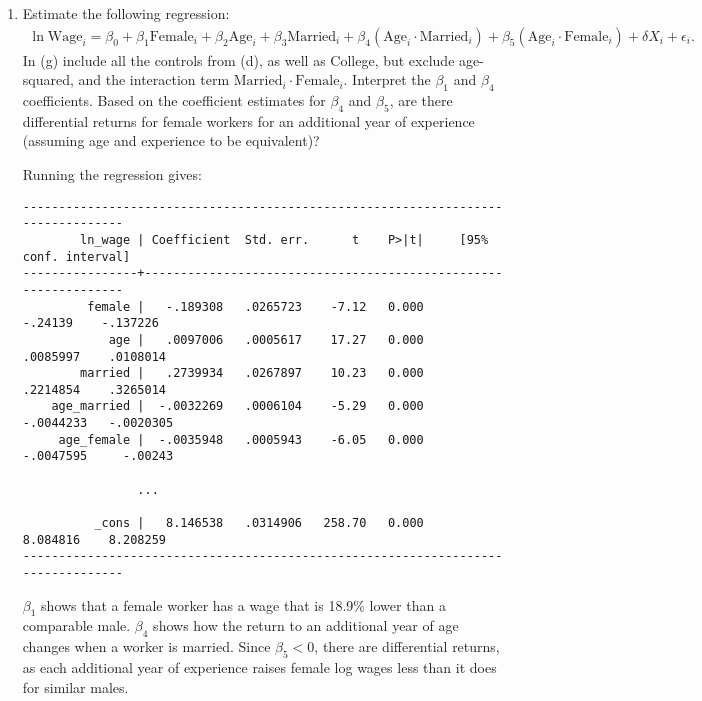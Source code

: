 \documentclass[11pt,twoside,openany]{memoir}
\begin{document}
\begin{question}
\begin{enumerate}[label = (\alph*),itemsep=1pt,topsep=3pt]
        \item Estimate the following regression:
            \begin{equation*}
            \begin{split}
                \ln\text{Wage}_i = \beta_0 + \beta_1 \text{Female}_i + \beta_2 \text{Age}_i + \beta_3 \text{Married}_i + \beta_4 (\text{Age}_i \cdot \text{Married}_i) + \beta_5 (\text{Age}_i \cdot \text{Female}_i)+ \delta X_i + \epsilon_i.
            \end{split}
            \end{equation*}
        In (g) include all the controls from (d), as well as College, but exclude age-squared, and the interaction term $\text{Married}_i \cdot \text{Female}_i$. Interpret the $\beta_1$ and $\beta_4$ coefficients. Based on the coefficient estimates for $\beta_4$ and $\beta_5$, are there differential returns for female workers for an additional year of experience (assuming age and experience to be equivalent)?
            {\color{blue} \begin{solution}
                Running the regression gives:
                \begin{Verbatim}
---------------------------------------------------------------------------------
        ln_wage | Coefficient  Std. err.      t    P>|t|     [95% conf. interval]
----------------+----------------------------------------------------------------
         female |   -.189308   .0265723    -7.12   0.000      -.24139    -.137226
            age |   .0097006   .0005617    17.27   0.000     .0085997    .0108014
        married |   .2739934   .0267897    10.23   0.000     .2214854    .3265014
    age_married |  -.0032269   .0006104    -5.29   0.000    -.0044233   -.0020305
     age_female |  -.0035948   .0005943    -6.05   0.000    -.0047595     -.00243
       
                ...

          _cons |   8.146538   .0314906   258.70   0.000     8.084816    8.208259
---------------------------------------------------------------------------------   
                \end{Verbatim}

                $\beta_1$ shows that a female worker has a wage that is 18.9\% lower than a comparable male. $\beta_4$ shows how the return to an additional year of age changes when a worker is married. Since $\beta_5 < 0$, there are differential returns, as each additional year of experience raises female log wages less than it does for similar males.
            \end{solution}}


\end{enumerate}
\end{question}
\end{document}
